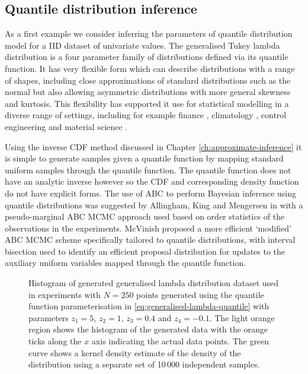 \subsection{Quantile distribution inference}

As a first example we consider inferring the parameters of quantile distribution model for a \acs{IID} dataset of univariate values. The generalised Tukey lambda distribution \citep{ramberg1974approximate,freimer1988study} is a four parameter family of distributions defined via its quantile function. It has very flexible form which can describe distributions with a range of shapes, including close approximations of standard distributions such as the normal but also allowing asymmetric distributions with more general skewness and kurtosis. This flexibility has supported it use for statistical modelling in a diverse range of settings, including for example finance \citep{corrado2001option}, climatology \citep{ozturk1982study}, control engineering \citep{pal2004evaluation} and material science \citep{bigerelle2006application}.

Using the inverse \ac{CDF} method discussed in Chapter \ref{ch:approximate-inference} it is simple to generate samples given a quantile function by mapping standard uniform samples through the quantile function. The quantile function does not have an analytic inverse however so the \ac{CDF} and corresponding density function do not have explicit forms. The use of \ac{ABC} to perform Bayesian inference using quantile distributions was suggested by Allingham, King and Mengersen in \citep{allingham2009bayesian} with a pseudo-marginal \ac{ABC} \ac{MCMC} approach used based on order statistics of the observations in the experiments. McVinish \citep{mcvinish2012improving} proposed a more efficient `modified' \ac{ABC} \ac{MCMC} scheme specifically tailored to quantile distributions, with interval bisection used to identify an efficient proposal distribution for updates to the auxiliary uniform variables mapped through the quantile function.

\begin{figure}[t]
\centering
{}
\caption[Generated generalised lambda distribution data.]{Histogram of generated generalised lambda distribution dataset used in experiments with $N=250$ points generated using the quantile function parameterisation in \eqref{eq:generalised-lambda-quantile} with parameters $z_1 = 5$, $z_2 = 1$, $z_3 = 0.4$ and $z_4 = -0.1$. The light orange region shows the histogram of the generated data with the orange ticks along the $x$ axis indicating the actual data points. The green curve shows a kernel density estimate of the density of the distribution using a separate set of 10\,000 independent samples.}
\label{fig:generalised-lambda-generated-data}
\end{figure}

